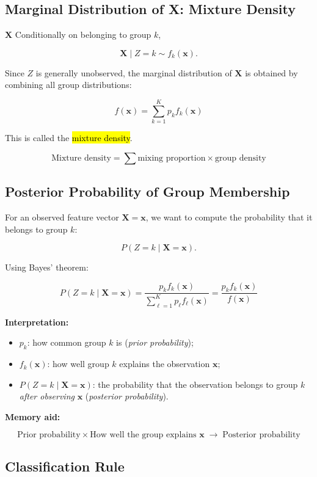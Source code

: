 \documentclass[a4paper,11pt]{article}
\begin{document}
\subsection{Marginal Distribution of X: Mixture Density}
$\bm{X}$
Conditionally on belonging to group $k$,

$$
\bm{X}\mid Z=k\sim f_k(\mathbf{x}).
$$

Since $Z$ is generally unobserved, the marginal distribution of $\bm{X}$ is
obtained by combining all group distributions:

$$
\boxed{
f(\mathbf{x})
=
\sum_{k=1}^K p_k f_k(\mathbf{x})
}
$$

This is called the \hl{mixture density}.

$$
\boxed{
\text{Mixture density}
=
\sum
\text{mixing proportion}
\times
\text{group density}
}
$$

\subsection{Posterior Probability of Group Membership}

For an observed feature vector $\bm{X}=\mathbf{x}$, we want to compute the
probability that it belongs to group $k$:

$$
P(Z=k\mid \bm{X}=\mathbf{x}).
$$

Using Bayes' theorem:

$$
\boxed{
P(Z=k\mid \bm{X}=\mathbf{x})
=
\frac{p_kf_k(\mathbf{x})}
{\displaystyle\sum_{\ell=1}^K p_\ell f_\ell(\mathbf{x})}
=
\frac{p_kf_k(\mathbf{x})}{f(\mathbf{x})}
}
$$

\textbf{Interpretation:}
\begin{itemize}
\item $p_k$: how common group $k$ is (\textit{prior probability});
\item $f_k(\mathbf{x})$: how well group $k$ explains the observation
$\mathbf{x}$;
\item $P(Z=k\mid\bm{X}=\mathbf{x})$: the probability that the observation
belongs to group $k$ \emph{after observing} $\mathbf{x}$ (\textit{posterior
probability}).
\end{itemize}

\textbf{Memory aid:}

$$
\boxed{
\text{Prior probability}
\times
\text{How well the group explains }\mathbf{x}
\;\longrightarrow\;
\text{Posterior probability}
}
$$

\subsection{Classification Rule}
\end{document}
